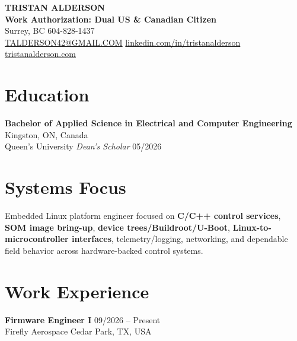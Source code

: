 \documentclass[letterpaper,10pt]{article}
\begin{document}
    \begin{center}
        {\Huge \textbf{\color{deepblue} TRISTAN ALDERSON}} \\
        \textbf{\color{deepblue} Work Authorization: Dual US \& Canadian Citizen} \\
        \vspace{5pt}
        Surrey, BC \textbullet{} 604-828-1437 \\
        \href{mailto:TALDERSON42@GMAIL.COM}{TALDERSON42@GMAIL.COM} \textbullet{}
        \href{https://www.linkedin.com/in/tristanalderson/}{linkedin.com/in/tristanalderson} \textbullet{}
        \href{https://tristanalderson.com/}{tristanalderson.com} \\
    \end{center}

    \section{Education}
    \noindent \textbf{Bachelor of Applied Science in Electrical and Computer Engineering} \hfill Kingston, ON, Canada \\
    Queen's University \textbullet{} \textit{Dean's Scholar} \hfill 05/2026

    \section{Systems Focus}
    \noindent Embedded Linux platform engineer focused on \textbf{C/C++ control services}, \textbf{SOM image bring-up}, \textbf{device trees/Buildroot/U-Boot}, \textbf{Linux-to-microcontroller interfaces}, telemetry/logging, networking, and dependable field behavior across hardware-backed control systems.

    \section{Work Experience}

    \noindent \textbf{Firmware Engineer I} \hfill 09/2026 -- Present \\
    Firefly Aerospace \hfill Cedar Park, TX, USA
\end{document}
